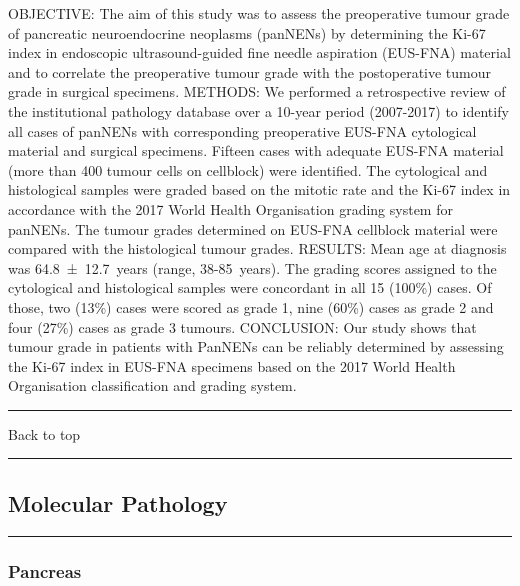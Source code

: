 \documentclass[]{article}
\begin{document}
OBJECTIVE: The aim of this study was to assess the preoperative tumour
grade of pancreatic neuroendocrine neoplasms (panNENs) by determining
the Ki-67 index in endoscopic ultrasound-guided fine needle aspiration
(EUS-FNA) material and to correlate the preoperative tumour grade with
the postoperative tumour grade in surgical specimens. METHODS: We
performed a retrospective review of the institutional pathology database
over a 10-year period (2007-2017) to identify all cases of panNENs with
corresponding preoperative EUS-FNA cytological material and surgical
specimens. Fifteen cases with adequate EUS-FNA material (more than 400
tumour cells on cellblock) were identified. The cytological and
histological samples were graded based on the mitotic rate and the Ki-67
index in accordance with the 2017 World Health Organisation grading
system for panNENs. The tumour grades determined on EUS-FNA cellblock
material were compared with the histological tumour grades. RESULTS:
Mean age at diagnosis was 64.8~±~12.7~years (range, 38-85~years). The
grading scores assigned to the cytological and histological samples were
concordant in all 15 (100\%) cases. Of those, two (13\%) cases were
scored as grade 1, nine (60\%) cases as grade 2 and four (27\%) cases as
grade 3 tumours. CONCLUSION: Our study shows that tumour grade in
patients with PanNENs can be reliably determined by assessing the Ki-67
index in EUS-FNA specimens based on the 2017 World Health Organisation
classification and grading system.

{}

{}

\begin{center}\rule{0.5\linewidth}{\linethickness}\end{center}

Back to top

\begin{center}\rule{0.5\linewidth}{\linethickness}\end{center}

\pagebreak

\hypertarget{molecular-pathology}{%
\subsection{Molecular Pathology}\label{molecular-pathology}}

\begin{center}\rule{0.5\linewidth}{\linethickness}\end{center}

\hypertarget{pancreas-2}{%
\subsubsection{Pancreas}\label{pancreas-2}}
\end{document}
